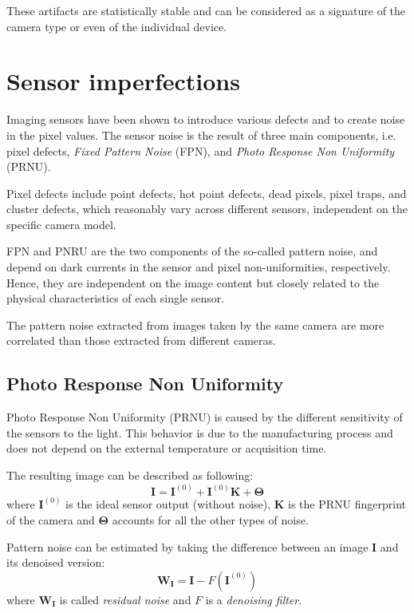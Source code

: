 \documentclass[a4paper, 11pt]{article}
\begin{document}
These artifacts are statistically stable and can be considered as a signature of the camera type or even of the individual
device.

\section*{Sensor imperfections}
Imaging sensors have been shown to introduce various defects and to create noise in the
pixel values. The sensor noise is the result of three main components, i.e. pixel defects, \textit{Fixed Pattern Noise} (FPN), and \textit{Photo Response Non Uniformity} (PRNU).

Pixel defects include point defects, hot point defects, dead pixels, pixel traps, and cluster defects, which reasonably vary across different sensors, independent on the specific camera model.

FPN and PNRU are the two components of the so-called pattern noise, and depend on
dark currents in the sensor and pixel non-uniformities, respectively. Hence, they are
independent on the image content but closely related to the physical characteristics of each single sensor.

The pattern noise extracted from images taken by the same camera are more correlated than those extracted from different cameras.

\subsection*{Photo Response Non Uniformity}
Photo Response Non Uniformity (PRNU) is caused by the different sensitivity of the sensors to the light. This behavior is due to the manufacturing process and does not depend on the external temperature or acquisition time.

The resulting image can be described as following:
\begin{equation}
\mathbf{I} = \mathbf{I}^{(0)} + \mathbf{I}^{(0)} \mathbf{K} + \mathbf{\Theta}
\end{equation}
where $\mathbf{I}^{(0)}$ is the ideal sensor output (without noise), $\mathbf{K}$ is the PRNU fingerprint of the camera and $\mathbf{\Theta}$ accounts for all the other types of noise.

Pattern noise can be estimated by taking the difference between an image $\mathbf{I}$ and its denoised version:
\begin{equation}\label{eq:imdiff}
\mathbf{W_I} = \mathbf{I}- F\left(\mathbf{I}^{(0)}\right)
\end{equation}
where $\mathbf{W_I}$ is called \textit{residual noise} and $F$ is a \textit{denoising filter}.
\end{document}
